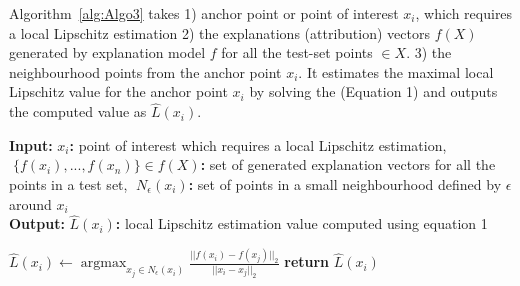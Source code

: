 \documentclass[english]{tktltiki2}
\theoremstyle{definition}
\theoremstyle{remark}
\newcommand{\onespace}{\;}
\begin{document}
Algorithm~\ref{alg:Algo3} takes 1) anchor point or point of interest $x_i$, which requires a local Lipschitz estimation 2) the explanations (attribution) vectors $f(X)$ generated by explanation model $f$  for all the test-set points $\in X$. 3) the neighbourhood points from the anchor point $x_i$. It estimates the maximal local Lipschitz value for the anchor point $x_i$ by solving the (Equation 1) and outputs the computed value as $\hat{L}(x_i)$.
\begin{algorithm}[H]
	\caption{$LocalLipschitzEstimate(x_i,\onespace f(X),\onespace N_\epsilon(x_i))$}
	\label{alg:Algo3}
	\hspace*{\algorithmicindent} \textbf{Input}\textbf{:} $x_i$\textbf{:} point of interest which requires a local Lipschitz estimation, $\onespace \{f(x_i),...,f(x_n)\} \in f(X)$\textbf{:} set of generated explanation vectors for all the points in a test set, $\onespace N_\epsilon(x_i)$\textbf{:} set of points in a small neighbourhood defined by $\epsilon$ around $x_i$ \\
	\hspace*{\algorithmicindent} \textbf{Output}\textbf{:} $\hat{L}(x_i)$\textbf{:} local Lipschitz estimation value computed using equation 1
	\begin{algorithmic}[1]
		\State $\hat{L}(x_i) \gets \operatorname*{argmax}_{x_j \in N_\epsilon(x_i)} \frac{||f(x_i) - f(x_j)||_2}{||x_i - x_j||_2}$ 
		\State \textbf{return} $\hat{L}(x_i)$

	\end{algorithmic}
\end{algorithm}
\end{document}
